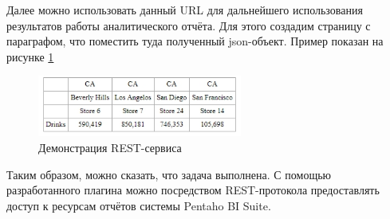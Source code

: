 Далее можно использовать данный URL для дальнейшего использования результатов работы аналитического отчёта. Для этого создадим страницу с параграфом, что поместить туда полученный json-объект. Пример показан на рисунке \ref{fig:gen_url2}

\begin{figure}[htbp]
	\centering
	\includegraphics[width=0.6\textwidth]{fig/chapter_6/gen_url2}
	\caption{Демонстрация REST-сервиса}
	\label{fig:gen_url2}
\end{figure}

Таким образом, можно сказать, что задача выполнена. С помощью разработанного плагина можно посредством REST-протокола предоставлять доступ к ресурсам отчётов системы Pentaho BI Suite.